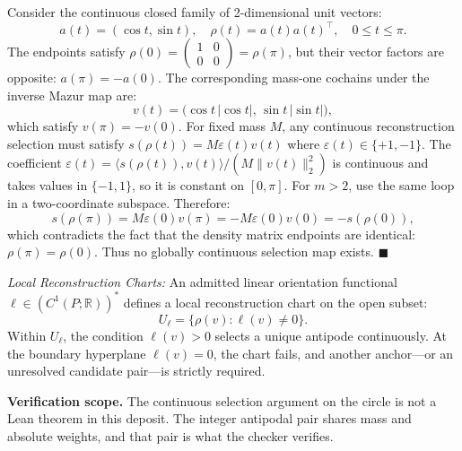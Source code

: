 \documentclass[
  10pt,
]{article}
\begin{document}
Consider the continuous closed family of 2-dimensional unit vectors: \protect\hypertarget{math-E0114-0143}{}{\[a(t) = (\cos t, \sin t), \quad \rho(t) = a(t) a(t)^\top, \quad 0 \le t \le \pi.\]} The endpoints satisfy \protect\hypertarget{math-E0115-0144}{}{\(\rho(0) = \begin{pmatrix}1&0\\0&0\end{pmatrix} = \rho(\pi)\)}, but their vector factors are opposite: \protect\hypertarget{math-E0116-0145}{}{\(a(\pi) = -a(0)\)}. The corresponding mass-one cochains under the inverse Mazur map are: \protect\hypertarget{math-E0117-0146}{}{\[v(t) = \bigl(\cos t \, |\cos t|, \, \sin t \, |\sin t|\bigr),\]} which satisfy \protect\hypertarget{math-E0118-0147}{}{\(v(\pi) = -v(0)\)}. For fixed mass \protect\hypertarget{math-E0119-0148}{}{\(M\)}, any continuous reconstruction selection must satisfy \protect\hypertarget{math-E0120-0149}{}{\(s(\rho(t)) = M\varepsilon(t) v(t)\)} where \protect\hypertarget{math-E0121-0150}{}{\(\varepsilon(t) \in \{+1, -1\}\)}. The coefficient \protect\hypertarget{math-E0122-0151}{}{\(\varepsilon(t)=\langle s(\rho(t)),v(t)\rangle/(M\|v(t)\|_2^2)\)} is continuous and takes values in \protect\hypertarget{math-E0123-0152}{}{\(\{-1,1\}\)}, so it is constant on \protect\hypertarget{math-E0124-0153}{}{\([0,\pi]\)}. For \protect\hypertarget{math-E0125-0154}{}{\(m>2\)}, use the same loop in a two-coordinate subspace. Therefore: \protect\hypertarget{math-E0126-0155}{}{\[s(\rho(\pi)) = M\varepsilon(0) v(\pi) = -M\varepsilon(0) v(0) = -s(\rho(0)),\]} which contradicts the fact that the density matrix endpoints are identical: \protect\hypertarget{math-E0127-0156}{}{\(\rho(\pi) = \rho(0)\)}. Thus no globally continuous selection map exists. \protect\hypertarget{math-E0030-0157}{}{\(\blacksquare\)}

\emph{Local Reconstruction Charts:} An admitted linear orientation functional \protect\hypertarget{math-E0128-0158}{}{\(\ell \in (C^1(P; \mathbb{R}))^*\)} defines a local reconstruction chart on the open subset: \protect\hypertarget{math-E0129-0159}{}{\[U_\ell = \{\rho(v) : \ell(v) \ne 0\}.\]} Within \protect\hypertarget{math-E0130-0160}{}{\(U_\ell\)}, the condition \protect\hypertarget{math-E0131-0161}{}{\(\ell(v) > 0\)} selects a unique antipode continuously. At the boundary hyperplane \protect\hypertarget{math-E0132-0162}{}{\(\ell(v) = 0\)}, the chart fails, and another anchor---or an unresolved candidate pair---is strictly required.

\textbf{Verification scope.} The continuous selection argument on the circle is not a Lean theorem in this deposit. The integer antipodal pair shares mass and absolute weights, and that pair is what the checker verifies.
\end{document}
